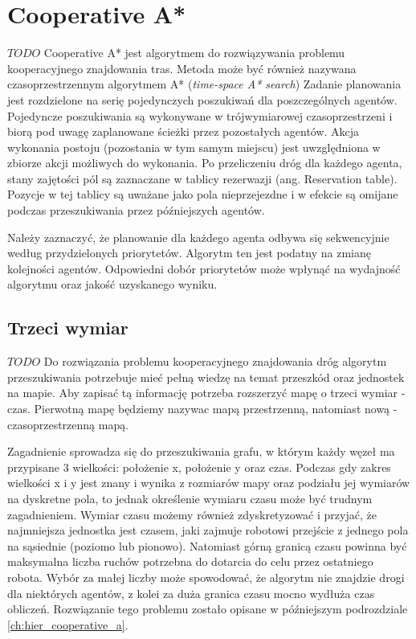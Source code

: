 \section{Cooperative A*}
$TODO$
Cooperative A* jest algorytmem do rozwiązywania problemu kooperacyjnego znajdowania tras.
Metoda może być również nazywana czasoprzestrzennym algorytmem A* ({\it time-space A* search})
Zadanie planowania jest rozdzielone na serię pojedynczych poszukiwań dla poszczególnych agentów.
Pojedyncze poszukiwania są wykonywane w trójwymiarowej czasoprzestrzeni i biorą pod uwagę zaplanowane ścieżki przez pozostałych agentów.
Akcja wykonania postoju (pozostania w tym samym miejscu) jest uwzględniona w zbiorze akcji możliwych do wykonania.
Po przeliczeniu dróg dla każdego agenta, stany zajętości pól są zaznaczane w tablicy rezerwazji (ang. Reservation table).
Pozycje w tej tablicy są uważane jako pola nieprzejezdne i w efekcie są omijane podczas przeszukiwania przez późniejszych agentów. \cite{cooppath}

Należy zaznaczyć, że planowanie dla każdego agenta odbywa się sekwencyjnie według przydzielonych priorytetów.
Algorytm ten jest podatny na zmianę kolejności agentów. Odpowiedni dobór priorytetów może wpłynąć na wydajność algorytmu oraz jakość uzyskanego wyniku.

\subsection{Trzeci wymiar}
$TODO$
Do rozwiązania problemu kooperacyjnego znajdowania dróg algorytm przeszukiwania potrzebuje mieć pełną wiedzę na temat przeszkód oraz jednostek na mapie.
Aby zapisać tą informację potrzeba rozszerzyć mapę o trzeci wymiar - czas. 
Pierwotną mapę będziemy nazywac mapą przestrzenną, natomiast nową - czasoprzestrzenną mapą. \cite{cooppath}

Zagadnienie sprowadza się do przeszukiwania grafu, w którym każdy węzeł ma przypisane 3 wielkości: położenie x, położenie y oraz czas.
Podczas gdy zakres wielkości x i y jest znany i wynika z rozmiarów mapy oraz podziału jej wymiarów na dyskretne pola, to jednak określenie wymiaru czasu może być trudnym zagadnieniem.
Wymiar czasu możemy również zdyskretyzować i przyjać, że najmniejsza jednostka jest czasem, jaki zajmuje robotowi przejście z jednego pola na sąsiednie (poziomo lub pionowo). Natomiast górną granicą czasu powinna być maksymalna liczba ruchów potrzebna do dotarcia do celu przez ostatniego robota. Wybór za małej liczby może spowodować, że algorytm nie znajdzie drogi dla niektórych agentów, z kolei za duża granica czasu mocno wydłuża czas obliczeń. Rozwiązanie tego problemu zostało opisane w późniejszym podrozdziale \ref{ch:hier_cooperative_a}.

